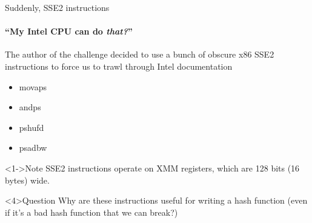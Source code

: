 \begin{frame}{Suddenly, SSE2 instructions}
    \framesubtitle{``My Intel CPU can do {\em that?}''}
    The author of the challenge decided to use a bunch of obscure x86 SSE2
    instructions to force us to trawl through Intel documentation

    \begin{itemize}
        \item<2-> movaps
        \item<2-> \alert<4->{andps}
        \item<2-> pshufd
        \item<2-> \alert<4->{psadbw}
    \end{itemize}

    \begin{block}<1->{Note}
        SSE2 instructions operate on XMM registers, which are 128 bits
        (16 bytes) wide.
    \end{block}

    \begin{alertblock}<4>{Question}
        Why are these instructions useful for writing a hash function (even if
        it's a bad hash function that we can break?)
    \end{alertblock}
\end{frame}

\newcommand{\StartCell}[2]{
    \node at (0,0) (#1) {\texttt{#2}};%
}
\newcommand{\Cell}[3]{
    \node [anchor=west] at (#1.east) (#2) {\texttt{#3}};%
}

\newcommand{\Xmm}[2]{%
    \getargsC{#2}%
    \raisebox{0.5em}{\texttt{xmm#1}:\xspace}%
    \begin{tikzpicture}[%
        every node/.style={%
            minimum width=1.5em,
            minimum height=0.75em,
            text height=0.75em,
            text depth=0.25em,
            outer sep=0pt,
            draw=black,
            semithick
        }
    ]%
        \StartCell{A}{\argi}%
        \Cell{A}{B}{\argii}%
        \Cell{B}{C}{\argiii}%
        \Cell{C}{D}{\argiv}%
        \Cell{D}{E}{\argv}%
        \Cell{E}{F}{\argvi}%
        \Cell{F}{G}{\argvii}%
        \Cell{G}{H}{\argviii}%
        \Cell{H}{I}{\argix}%
        \Cell{I}{J}{\argx}%
        \Cell{J}{K}{\argxi}%
        \Cell{K}{L}{\argxii}%
        \Cell{L}{M}{\argxiii}%
        \Cell{M}{N}{\argxiv}%
        \Cell{N}{O}{\argxv}%
        \Cell{O}{P}{\argxvi}%
    \end{tikzpicture}%
}

